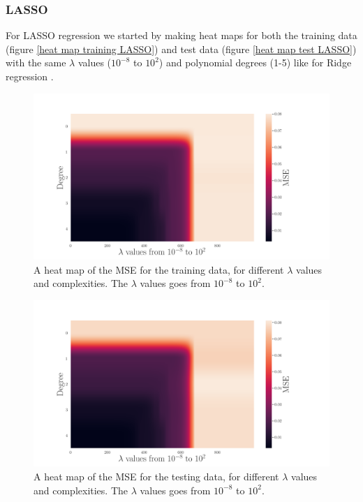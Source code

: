 \subsubsection{LASSO}
\noindent For LASSO regression we started by making heat maps for both the training data (figure \eqref{heat map training LASSO}) and test data (figure \eqref{heat map test LASSO}) with the same $\lambda$ values ($10^{-8}$ to $10^{2}$) and polynomial degrees (1-5) like for Ridge regression .

\begin{figure}[H]
	\centering
	\includegraphics[width=\linewidth]{images/Figure_9.png}
	\caption{A heat map of the MSE for the training data, for different $\lambda$ values and complexities. The $\lambda$ values goes from $10^{-8}$ to $10^{2}$. }
	\label{heat map training LASSO}
\end{figure}
%
\begin{figure}[H]
	\centering
	\includegraphics[width=\linewidth]{images/Figure_10.png}
	\caption{A heat map of the MSE for the testing data, for different $\lambda$ values and complexities. The $\lambda$ values goes from $10^{-8}$ to $10^{2}$.}
	\label{heat map test LASSO}
\end{figure}
